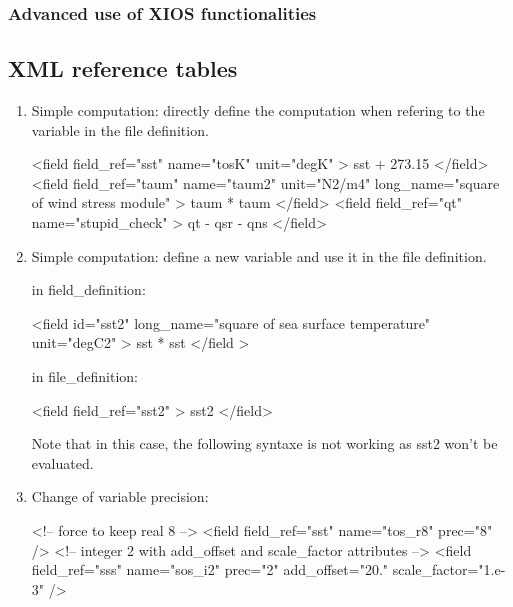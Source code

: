 \documentclass[../main/NEMO_manual]{subfiles}
\begin{document}
\subsubsection{Advanced use of XIOS functionalities}

\subsection{XML reference tables}
\label{subsec:DIA_IOM_xmlref}

\begin{enumerate}
\item Simple computation: directly define the computation when refering to the variable in the file definition.

\begin{xmllines}
<field field_ref="sst"  name="tosK"  unit="degK" > sst + 273.15 </field>
<field field_ref="taum" name="taum2" unit="N2/m4" long_name="square of wind stress module" >	taum * taum </field>
<field field_ref="qt"   name="stupid_check" > qt - qsr - qns </field>
\end{xmllines}

\item Simple computation: define a new variable and use it in the file definition.

in field\_definition:

\begin{xmllines}
<field id="sst2" long_name="square of sea surface temperature" unit="degC2" >  sst * sst </field >
\end{xmllines}

in file\_definition:

\begin{xmllines}
<field field_ref="sst2" > sst2 </field>
\end{xmllines}

Note that in this case, the following syntaxe  is not working as
sst2 won't be evaluated.

\item Change of variable precision:

\begin{xmllines}
<!-- force to keep real 8 -->
<field field_ref="sst" name="tos_r8" prec="8" />
<!-- integer 2  with add_offset and scale_factor attributes -->
<field field_ref="sss" name="sos_i2" prec="2" add_offset="20." scale_factor="1.e-3" />
\end{xmllines}


\end{enumerate}
\end{document}
